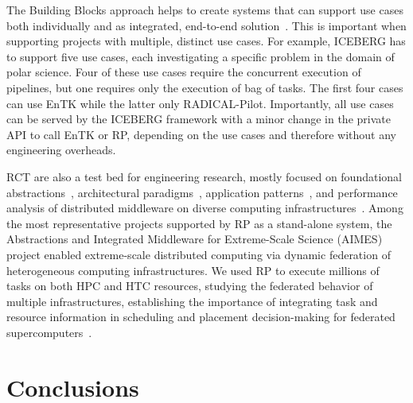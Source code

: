 \documentclass[preprint,12pt, a4paper]{elsarticle}
\begin{document}
The Building Blocks approach helps to create systems that can support use cases
both individually and as integrated, end-to-end
solution~\cite{turilli2019middleware}. This is important when supporting
projects with multiple, distinct use cases. For example, ICEBERG has to support
five use cases, each investigating a specific problem in the domain of polar
science. Four of these use cases require the concurrent execution of pipelines,
but one requires only the execution of bag of tasks. The first four cases can
use EnTK while the latter only RADICAL-Pilot. Importantly, all use cases can be
served by the ICEBERG framework with a minor change in the private API to call
EnTK or RP, depending on the use cases and therefore without any engineering
overheads.


RCT are also a test bed for engineering research, mostly focused on foundational
abstractions~\cite{turilli2017evaluating}, architectural
paradigms~\cite{turilli2018comprehensive}, application
patterns~\cite{balasubramanian2016extasy,balasubramanian2018harnessing}, and
performance analysis of distributed middleware on diverse computing
infrastructures~\cite{turilli2017evaluating,dakka2018high}. Among the most
representative projects supported by RP as a stand-alone system, the Abstractions
and Integrated Middleware for Extreme-Scale Science (AIMES) project enabled
extreme-scale distributed computing via dynamic federation of heterogeneous
computing infrastructures. We used RP to execute millions of tasks on both HPC
and HTC resources, studying the federated behavior of multiple infrastructures,
establishing the importance of integrating task and resource information in
scheduling and placement decision-making for federated
supercomputers~\cite{turilli2016integrating}.


\section{Conclusions}\label{sec:conclusions}
\end{document}
